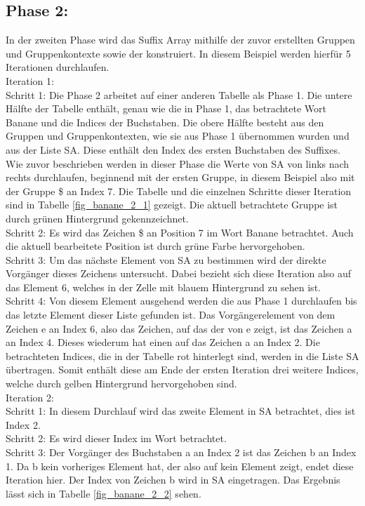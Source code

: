 \subsection*{Phase 2:}
In der zweiten Phase wird das Suffix Array mithilfe der zuvor erstellten Gruppen und Gruppenkontexte sowie der \prevpointer konstruiert. 
In diesem Beispiel werden hierfür 5 Iterationen durchlaufen.\\

Iteration 1:\\
Schritt 1: Die Phase 2 arbeitet auf einer anderen Tabelle als Phase 1. 
Die untere Hälfte der Tabelle enthält, genau wie die in Phase 1, das betrachtete Wort Banane und die Indices der Buchstaben. 
Die obere Hälfte besteht aus den Gruppen und Gruppenkontexten, wie sie aus Phase 1 übernommen wurden und aus der Liste SA. 
Diese enthält den Index des ersten Buchstaben des Suffixes.
Wie zuvor beschrieben werden in dieser Phase die Werte von SA von links nach rechts durchlaufen, beginnend mit der ersten Gruppe, in diesem Beispiel also mit der Gruppe \$ an Index 7. 
Die Tabelle und die einzelnen Schritte dieser Iteration sind in Tabelle \ref{fig_banane_2_1} gezeigt. 
Die aktuell betrachtete Gruppe ist durch grünen Hintergrund gekennzeichnet. \\
Schritt 2: Es wird das Zeichen \$ an Position 7 im Wort Banane betrachtet. 
Auch die aktuell bearbeitete Position ist durch grüne Farbe hervorgehoben. \\
Schritt 3: Um das nächste Element von SA zu bestimmen wird der direkte Vorgänger dieses Zeichens untersucht. 
Dabei bezieht sich diese Iteration also auf das Element 6, welches in der Zelle mit blauem Hintergrund zu sehen ist. \\
Schritt 4: Von diesem Element ausgehend werden die \prevpointer aus Phase 1 durchlaufen bis das letzte Element dieser Liste gefunden ist. 
Das Vorgängerelement von dem Zeichen e an Index 6, also das Zeichen, auf das der \prevpointer von e zeigt, ist das Zeichen a an Index 4. 
Dieses wiederum hat einen \prevpointer auf das Zeichen a an Index 2. Die betrachteten Indices, die in der Tabelle rot hinterlegt sind, werden in die Liste SA übertragen. 
Somit enthält diese am Ende der ersten Iteration drei weitere Indices, welche durch gelben Hintergrund hervorgehoben sind. \\

Iteration 2:\\
Schritt 1: In diesem Durchlauf wird das zweite Element in SA betrachtet, dies ist Index 2.\\
Schritt 2: Es wird dieser Index im Wort betrachtet.\\
Schritt 3: Der Vorgänger des Buchstaben a an Index 2 ist das Zeichen b an Index 1. 
Da b kein vorheriges Element hat, der \prevpointer also auf kein Element zeigt, endet diese Iteration hier. 
Der Index von Zeichen b wird in SA eingetragen. Das Ergebnis lässt sich in Tabelle \ref{fig_banane_2_2} sehen.\\

